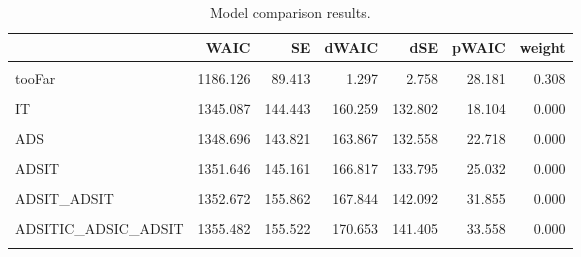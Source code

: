 \documentclass[preprint,12pt]{elsarticle}
\begin{document}
\begin{table}
\centering\begingroup\fontsize{9}{11}\selectfont
\begin{tabular}{lrrrrrr}
\toprule
  & WAIC & SE & dWAIC & dSE & pWAIC & weight\\
\midrule
\cellcolor{gray!6}{Final} & \cellcolor{gray!6}{1184.829} & \cellcolor{gray!6}{89.779} & \cellcolor{gray!6}{0.000} & \cellcolor{gray!6}{NA} & \cellcolor{gray!6}{26.871} & \cellcolor{gray!6}{0.590}\\
tooFar & 1186.126 & 89.413 & 1.297 & 2.758 & 28.181 & 0.308\\
\cellcolor{gray!6}{ADSITICCBS\_ITIC\_ADSIC} & \cellcolor{gray!6}{1188.337} & \cellcolor{gray!6}{87.058} & \cellcolor{gray!6}{3.508} & \cellcolor{gray!6}{6.184} & \cellcolor{gray!6}{24.822} & \cellcolor{gray!6}{0.102}\\
IT & 1345.087 & 144.443 & 160.259 & 132.802 & 18.104 & 0.000\\
\cellcolor{gray!6}{null} & \cellcolor{gray!6}{1345.550} & \cellcolor{gray!6}{145.960} & \cellcolor{gray!6}{160.721} & \cellcolor{gray!6}{134.243} & \cellcolor{gray!6}{18.616} & \cellcolor{gray!6}{0.000}\\
ADS & 1348.696 & 143.821 & 163.867 & 132.558 & 22.718 & 0.000\\
\cellcolor{gray!6}{ADSITIC\_ADSIC} & \cellcolor{gray!6}{1351.556} & \cellcolor{gray!6}{152.861} & \cellcolor{gray!6}{166.728} & \cellcolor{gray!6}{139.154} & \cellcolor{gray!6}{29.070} & \cellcolor{gray!6}{0.000}\\
ADSIT & 1351.646 & 145.161 & 166.817 & 133.795 & 25.032 & 0.000\\
\cellcolor{gray!6}{ADSITIC} & \cellcolor{gray!6}{1352.087} & \cellcolor{gray!6}{146.835} & \cellcolor{gray!6}{167.258} & \cellcolor{gray!6}{134.608} & \cellcolor{gray!6}{27.254} & \cellcolor{gray!6}{0.000}\\
ADSIT\_ADSIT & 1352.672 & 155.862 & 167.844 & 142.092 & 31.855 & 0.000\\
\cellcolor{gray!6}{ADSIC} & \cellcolor{gray!6}{1352.892} & \cellcolor{gray!6}{146.359} & \cellcolor{gray!6}{168.064} & \cellcolor{gray!6}{134.313} & \cellcolor{gray!6}{26.421} & \cellcolor{gray!6}{0.000}\\
ADSITIC\_ADSIC\_ADSIT & 1355.482 & 155.522 & 170.653 & 141.405 & 33.558 & 0.000\\
\cellcolor{gray!6}{ADSITIC\_ADSIT\_ITIC\_ADSIC} & \cellcolor{gray!6}{1355.783} & \cellcolor{gray!6}{155.273} & \cellcolor{gray!6}{170.954} & \cellcolor{gray!6}{141.128} & \cellcolor{gray!6}{33.771} & \cellcolor{gray!6}{0.000}\\
\bottomrule
\end{tabular}
\endgroup{}
\caption{Model comparison results.}
\label{tab:comparison}
\end{table}
\end{document}
